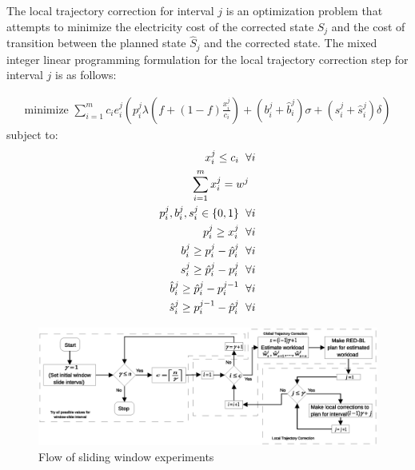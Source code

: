 The local trajectory correction for interval $j$ is an optimization problem that attempts to minimize the electricity cost of the corrected state $S_j$ and the cost of transition between the planned state $\hat{S}_j$ and the corrected state. The mixed integer linear programming formulation for the local trajectory correction step for interval $j$ is as follows:
    
\begin{align}
\text{minimize } \sum_{i=1}^{m} c_i e_i^j\left(p_i^j \lambda\left(f+\left(1-f\right)\frac{x_i^j}{c_i}\right) + \left(b_i^j+\hat{b}_i^j\right) \sigma + \left(s_i^j+\hat{s}_i^j\right) \delta\right)
\end{align}
subject to:
\begin{align}
x_i^j \le c_i \hspace{6 pt} \forall i \label{eq:lcapcon}\\
\sum_{i = 1}^{m} x_i^j = w^j \hspace{6 pt} \label{eq:lworkcon}\\
p_i^j, b_i^j, s_i^j \in \{0,1\} \hspace{6 pt} \forall i \label{eq:linteger1}\\
p_i^j \ge x_i^j \hspace{6 pt} \forall i \label{eq:lp1}\\
b_i^j \ge p_i^j - \hat{p}_i^j \hspace{6 pt} \forall i \label{eq:lbcon}\\
s_i^j \ge \hat{p}_i^j - p_i^j \hspace{6 pt} \forall i \label{eq:lscon}\\
\hat{b}_i^j \ge \hat{p}_i^j - p_i^{j-1} \hspace{6 pt} \forall i \label{eq:lbcon1} \\
\hat{s}_i^j \ge p_i^{j-1} - \hat{p}_i^j \hspace{6 pt} \forall i \label{eq:lscon1}
\end{align}

\begin{figure}
\includegraphics[width=1\linewidth]{pics/flowchart2.eps}
\caption{Flow of sliding window experiments}
\label{fig:flowchart}
\end{figure}

